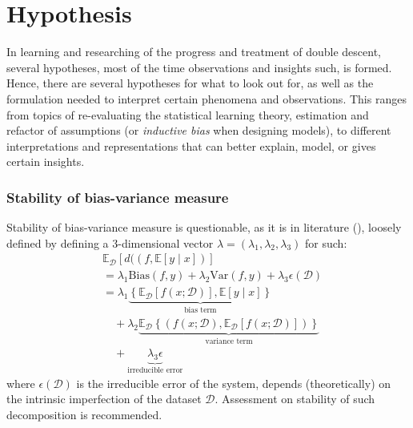 \documentclass[
  journal=largetwo,
  year=2025,
  volume=37,
]{cup-journal}
\begin{document}
\clearpage

\section{Hypothesis}

In learning and researching of the progress and treatment of double descent, several hypotheses, most of the time observations and insights such, is formed. Hence, there are several hypotheses for what to look out for, as well as the formulation needed to interpret certain phenomena and observations. This ranges from topics of re-evaluating the statistical learning theory, estimation and refactor of assumptions (or \textit{inductive bias} when designing models), to different interpretations and representations that can better explain, model, or gives certain insights.  
\subsubsection{Stability of bias-variance measure}
Stability of bias-variance measure is questionable, as it is in literature (\cite{domingos_unifeid_2000}), loosely defined by defining a 3-dimensional vector $\lambda=(\lambda_{1},\lambda_{2},\lambda_{3})$ for such: 
\noindent 
\begin{equation*}
        \begin{split}
            &\mathbb{E}_{\mathcal{D}} \left[d((f,\mathbb{E}[y\mid x])\right] \\
            & = \lambda_{1} \mathrm{Bias}(f,y) + \lambda_{2}\mathrm{Var}(f,y)+ \lambda_{3}\epsilon(\mathcal{D})\\ 
            & = \lambda_{1}\underbrace{\left\{ \mathbb{E}_{\mathcal{D}}[f(x;\mathcal{D})] , \mathbb{E}[y\mid x] \right\}}_{\text{bias term}} \\
            &\quad +\lambda_{2} \underbrace{\mathbb{E}_{\mathcal{D}} \left\{(f(x;\mathcal{D}), \mathbb{E}_{\mathcal{D}}[f(x;\mathcal{D})])\right\}}_{\text{variance term}} \\
            &\quad +\underbrace{\lambda_{3}\epsilon}_{\text{irreducible error}}
        \end{split}
\end{equation*}
where $\epsilon(\mathcal{D})$ is the irreducible error of the system, depends (theoretically) on the intrinsic imperfection of the dataset $\mathcal{D}$. Assessment on stability of such decomposition is recommended. 
\end{document}
